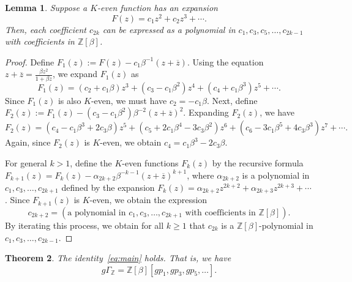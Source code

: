 \documentclass[dvipdfmx]{amsart}
\newtheorem{thm}{Theorem}[section]
\newtheorem{lemma}[thm]{Lemma}
\theoremstyle{definition}
\theoremstyle{remark}
\def\ZZ{\mathord{\mathbb{Z}}}
\begin{document}
\begin{lemma}\label{lemma:expansion_of_Keven}
Suppose a \( K \)-even function has an expansion
\[
F(z) = c_1 z^2 + c_2 z^3 + \cdots.
\]
Then, each coefficient \( c_{2k} \) can be expressed as a polynomial in \( c_1, c_3, c_5, \dots, c_{2k-1} \) with coefficients in \( \mathbb{Z}[\beta] \).
\end{lemma}

\begin{proof}
Define
$
F_1(z) := F(z) - c_1\beta^{-1} (z + \overline{z})
$.
Using the equation \( z + \overline{z} = \frac{\beta z^2}{1 + \beta z} \), we expand $F_1(z)$ as 
\[
F_1(z) = (c_2 + c_1 \beta) z^3 + (c_3 - c_1 \beta^2) z^4 + (c_4 + c_1 \beta^3) z^5 + \cdots.
\]
Since \( F_1(z) \) is also \( K \)-even, we must have \( c_2 = -c_1 \beta \).
Next, define \( F_2(z) := F_1(z) - (c_3 - c_1 \beta^2) \beta^{-2}(z + \overline{z})^2 \).  
Expanding $F_2(z)$, we have
\[
F_2(z) = (c_4 - c_1 \beta^3 + 2 c_3 \beta) z^5 
+ (c_5 + 2 c_1 \beta^4 - 3 c_3 \beta^2) z^6 
+ (c_6 - 3 c_1 \beta^5 + 4 c_3 \beta^3) z^7 + \cdots.
\]
Again, since \( F_2(z) \) is \( K \)-even, we obtain \( c_4 = c_1 \beta^3 - 2 c_3 \beta \).

For general $k>1$, define the $K$-even functions $F_k(z)$ by the recursive formula $F_{k+1}(z)=F_k(z)-\alpha_{2k+2}\beta^{-k-1}(z+\overline{z})^{k+1}$, where $\alpha_{2k+2}$ is a polynomial in $c_1,c_3,\dots,c_{2k+1}$ defined by the expansion $F_k(z)=\alpha_{2k+2}z^{2k+2}+\alpha_{2k+3}z^{2k+3}+\cdots$.
Since $F_{k+1}(z)$ is $K$-even, we obtain the expression
\[
c_{2k+2}=
(\text{a polynomial in } c_1,c_3,\dots,c_{2k+1}\text{ with coefficients in }\ZZ[\beta]).
\] 
By iterating this process, we obtain for all \( k \geq 1 \) that \( c_{2k} \) is a \( \mathbb{Z}[\beta] \)-polynomial in \( c_1, c_3, \dots, c_{2k-1} \).
\end{proof}

\begin{thm}
The identity~\eqref{eq:main} holds. That is, we have
\[
g\Gamma_{\mathbb{Z}} = \mathbb{Z}[\beta][gp_1, gp_3, gp_5, \dots].
\]
\end{thm}
\end{document}

